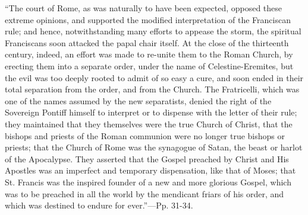 ``The court of Rome, as was naturally to have been expected,
opposed these extreme opinions, and supported the modified
interpretation of the Franciscan rule; and hence, notwithstanding many
efforts to appease the storm, the spiritual Franciscans soon attacked
the papal chair itself. At the close of the thirteenth century,
indeed, an effort was made to re-unite them to the Roman Church, by
erecting them into a separate order, under the name of Celestine-Eremites,
but the evil was too deeply rooted to admit of so easy a cure, and
soon ended in their total separation from the order, and from the
Church. The Fratricelli, which was one of the names assumed by the new
separatists, denied the right of the Sovereign Pontiff himself to
interpret or to dispense with the letter of their rule; they
maintained that they themselves were the true Church of Christ, that
the bishops and priests of the Roman communion were no longer true
bishops or priests; that the Church of Rome was the synagogue of
Satan, the beast or harlot of the Apocalypse. They asserted that the
Gospel preached by Christ and His Apostles was an imperfect and
temporary dispensation, like that of Moses; that St. Francis was the
inspired founder of a new and more glorious Gospel, which was to be
preached in all the world by the mendicant friars of his order, and
which was destined to endure for ever.''—Pp. 31-34.

